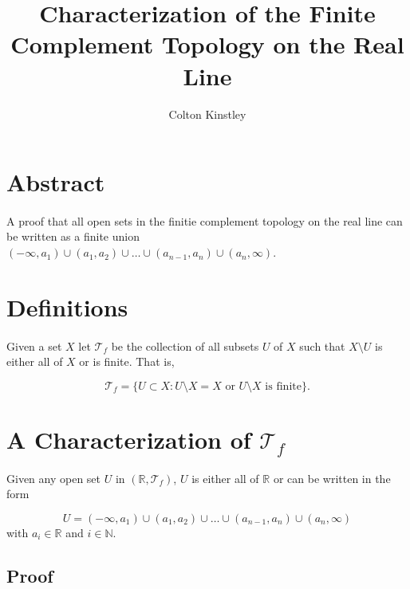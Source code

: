 \documentclass[11pt, oneside]{article}   	%
\title{Characterization of the Finite Complement Topology on the Real Line}
\author{Colton Kinstley}
\begin{document}
\maketitle



\section*{Abstract}
\paragraph{}

A proof that all open sets in the finitie complement topology on the real line can be written as a finite union $(- \infty , a_1) \cup (a_1,a_2) \cup \dots \cup (a_{n-1}, a_n) \cup (a_n, \infty)$.


\section*{Definitions}
\paragraph{}

Given a set $X$ let $\mathscr{T}_f$ be the collection of all subsets $U$ of $X$ such that $X \setminus U$ is either all of $X$ or is finite. That is,

\[
\mathscr{T}_f = \{ U \subset X : U \setminus X = X \text{ or } U \setminus X \text{ is finite} \}.
\]




\section*{A Characterization of $\mathscr{T}_f$}
\paragraph{}

Given any open set $U$ in $(\mathbb{R},\mathscr{T}_f)$, $U$ is either all of $\mathbb{R}$ or can be written in the form

\[
U = (- \infty , a_1) \cup (a_1,a_2) \cup \dots \cup (a_{n-1}, a_n) \cup (a_n, \infty)
\]
with $a_i \in \mathbb{R}$ and $ i \in \mathbb{N}$.

\subsection*{Proof}
\end{document}
